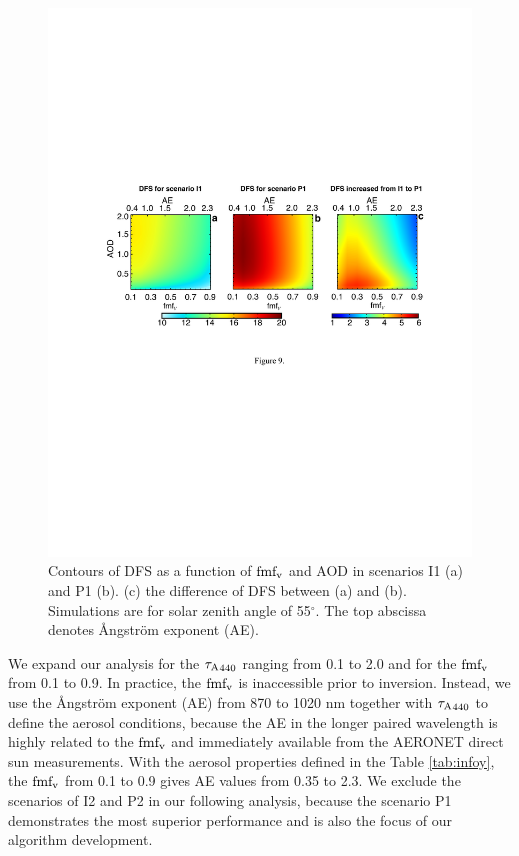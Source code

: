 \begin{figure}[t]
  \centering
  \includegraphics[width={\textwidth}]{figures/info09.pdf}
  \caption{Contours of DFS as a function of $\text{fmf}_\text{v}$ and AOD in scenarios
I1 (a) and P1 (b). (c) the difference of DFS between (a) and (b).
Simulations are for solar zenith angle of 55$^\circ$. The top abscissa denotes
Ångström exponent (AE).}
  \label{fig:infodfs2}
\end{figure}

We expand our analysis for the ${\tau_\text{A}}_{440}$ ranging from 0.1 to 2.0 
and for the $\text{fmf}_\text{v}$ from 0.1 to 0.9. In practice, the $\text{fmf}_\text{v}$ is 
inaccessible prior to inversion. Instead, we use the 
Ångström exponent (AE) from 870 to 1020 nm together with
${\tau_\text{A}}_{440}$ to define the aerosol conditions, because the AE
in the longer paired wavelength is highly related to the $\text{fmf}_\text{v}$
\citep{Schuster06} and immediately available from the AERONET direct sun 
measurements. With the aerosol properties defined in the Table
\ref{tab:infoy}, the $\text{fmf}_\text{v}$ from 0.1 to 0.9 gives AE values from
0.35 to 2.3. We exclude the scenarios of I2 and P2 in our following
analysis, because the scenario P1 demonstrates the most superior
performance and is also the focus of our algorithm development.

